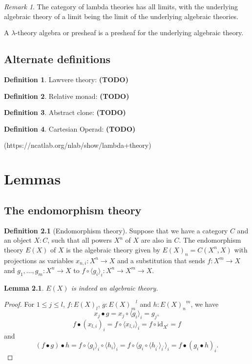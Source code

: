 \documentclass[a4paper]{amsbook}
\newtheorem{lemma}{Lemma}
\theoremstyle{definition}
\newtheorem{definition}{Definition}
\theoremstyle{remark}
\newtheorem{remark}{Remark}
\newcommand{\id}[1]{\ensuremath{\text{id}_{#1}}}
\newcommand\TODO{\textbf{(TODO)} }
\begin{document}
  \begin{remark}
    The category of lambda theories has all limits, with the underlying algebraic theory of a limit being the limit of the underlying algebraic theories.
  \end{remark}

  A $ \lambda $-theory algebra or presheaf is a presheaf for the underlying algebraic theory.

  \section{Alternate definitions}
  \begin{definition}
    Lawvere theory: \TODO
  \end{definition}
  \begin{definition}
    Relative monad: \TODO
  \end{definition}
  \begin{definition}
    Abstract clone: \TODO
  \end{definition}
  \begin{definition}
    Cartesian Operad: \TODO
  \end{definition}
  (https://ncatlab.org/nlab/show/lambda+theory)

  

  \chapter{Lemmas}

  \section{The endomorphism theory}

  \begin{definition}[Endomorphism theory]
    Suppose that we have a category $ C $ and an object $ X: C $, such that all powers $ X^n $ of $ X $ are also in $ C $.
    The endomorphism theory $ E(X) $ of $ X $ is the algebraic theory given by $ E(X)_n = C(X^n, X) $ with projections as variables $ x_{n, i}: X^n \to X $ and a substitution that sends $ f: X^m \to X $ and $ g_1, \dots, g_m: X^n \to X $ to $ f \circ \langle g_i \rangle_i: X^n \to X^m \to X $.
  \end{definition}

  \begin{lemma}
    $ E(X) $ is indeed an algebraic theory.
  \end{lemma}
  \begin{proof}
    For $ 1 \leq j \leq l $, $ f: E(X)_l $, $ g: {E(X)_m}^l $ and $ h: {E(X)_n}^m $, we have
    \[ x_j \bullet g = x_j \circ \langle g_i \rangle_i = g_j, \]
    \[ f \bullet (x_{l,i})_i = f \circ \langle x_{l, i} \rangle_i = f \circ \id{X^l} = f \]
    and
    \[ (f \bullet g) \bullet h = f \circ \langle g_i \rangle_i \circ \langle h_i \rangle_i = f \circ \langle g_i \circ \langle h_{i^\prime} \rangle_{i^\prime} \rangle_i = f \bullet (g_i \bullet h)_i. \]
  \end{proof}
\end{document}
